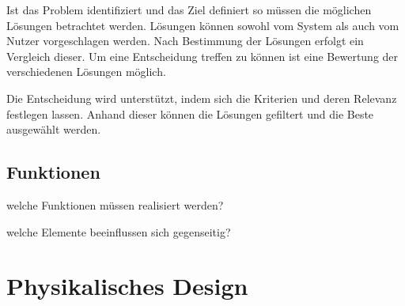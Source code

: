 Ist das Problem identifiziert und das Ziel definiert so müssen die möglichen Lösungen betrachtet werden. Lösungen können sowohl vom System als auch vom Nutzer vorgeschlagen werden. Nach Bestimmung der Lösungen erfolgt ein Vergleich dieser. Um eine Entscheidung treffen zu können ist eine Bewertung der verschiedenen Lösungen möglich.

Die Entscheidung wird unterstützt, indem sich die Kriterien und deren Relevanz festlegen lassen. Anhand dieser können die Lösungen gefiltert und die Beste ausgewählt werden.

\subsection{Funktionen}
welche Funktionen müssen realisiert werden?

welche Elemente beeinflussen sich gegenseitig?

\section{Physikalisches Design}